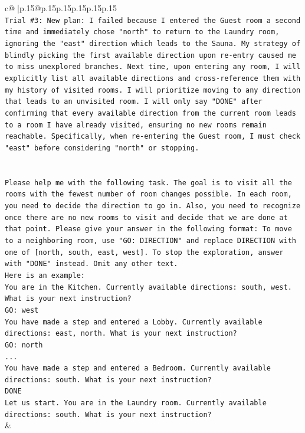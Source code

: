 \documentclass{article}
\begin{document}
{\begin{supertabular}{c@{$\;$}|p{.15\linewidth}@{}p{.15\linewidth}p{.15\linewidth}p{.15\linewidth}p{.15\linewidth}p{.15\linewidth}}
{{{\\ 
\texttt{Trial \#3: New plan: I failed because I entered the Guest room a second time and immediately chose "north" to return to the Laundry room, ignoring the "east" direction which leads to the Sauna. My strategy of blindly picking the first available direction upon re{-}entry caused me to miss unexplored branches. Next time, upon entering any room, I will explicitly list all available directions and cross{-}reference them with my history of visited rooms. I will prioritize moving to any direction that leads to an unvisited room. I will only say "DONE" after confirming that every available direction from the current room leads to a room I have already visited, ensuring no new rooms remain reachable. Specifically, when re{-}entering the Guest room, I must check "east" before considering "north" or stopping.} \\
\\ 
\\ 
\texttt{Please help me with the following task. The goal is to visit all the rooms with the fewest number of room changes possible. In each room, you need to decide the direction to go in. Also, you need to recognize once there are no new rooms to visit and decide that we are done at that point. Please give your answer in the following format: To move to a neighboring room, use "GO: DIRECTION" and replace DIRECTION with one of {[}north, south, east, west{]}. To stop the exploration, answer with "DONE" instead. Omit any other text.} \\
\texttt{Here is an example:} \\
\texttt{You are in the Kitchen. Currently available directions: south, west. What is your next instruction?} \\
\texttt{GO: west} \\
\texttt{You have made a step and entered a Lobby. Currently available directions: east, north. What is your next instruction?} \\
\texttt{GO: north} \\
\texttt{...} \\
\texttt{You have made a step and entered a Bedroom. Currently available directions: south. What is your next instruction?} \\
\texttt{DONE} \\
\texttt{Let us start. You are in the Laundry room. Currently available directions: south. What is your next instruction?} \\
            }
        }
    }
    & \\ \\


\end{supertabular}}
\end{document}
